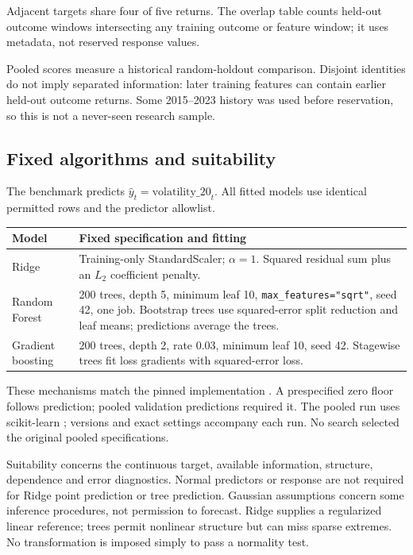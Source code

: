 \documentclass[10pt,letterpaper]{article}
\newcommand{\code}[1]{\texttt{\small #1}}\newcommand{\sd}{\operatorname{sd}}
\begin{document}
Adjacent targets share four of five returns. The overlap table counts held-out
outcome windows intersecting any training outcome or feature window; it uses
metadata, not reserved response values.
\begin{center}\end{center}
Pooled scores measure a historical random-holdout comparison. Disjoint identities
do not imply separated information: later training features can contain earlier
held-out outcome returns. Some 2015--2023 history was used before reservation,
so this is not a never-seen research sample.

\subsection{Fixed algorithms and suitability}
The benchmark predicts $\hat y_t=\mathrm{volatility\_20}_t$. All fitted models
use identical permitted rows and the predictor allowlist.
\begin{tabularx}{\linewidth}{@{}L{1.2in}X@{}}\toprule
Model & Fixed specification and fitting\\\midrule
Ridge & Training-only StandardScaler; $\alpha=1$. Squared residual sum plus an $L_2$ coefficient penalty.\\
Random Forest & 200 trees, depth 5, minimum leaf 10, \code{max\_features="sqrt"}, seed 42, one job. Bootstrap trees use squared-error split reduction and leaf means; predictions average the trees.\\
Gradient boosting & 200 trees, depth 2, rate 0.03, minimum leaf 10, seed 42. Stagewise trees fit loss gradients with squared-error loss.\\\bottomrule
\end{tabularx}

These mechanisms match the pinned implementation \cite{ridge_api,forest_api,boosting_api}.
A prespecified zero floor follows prediction; \FloorCount{} pooled validation
predictions required it. The pooled run uses scikit-learn \SklearnVersion{};
versions and exact settings accompany each run. No search selected the original
pooled specifications.

Suitability concerns the continuous target, available information, structure,
dependence and error diagnostics. Normal predictors or response are not required
for Ridge point prediction or tree prediction. Gaussian assumptions concern some
inference procedures, not permission to forecast. Ridge supplies a regularized
linear reference; trees permit nonlinear structure but can miss sparse extremes.
No transformation is imposed simply to pass a normality test.
\end{document}
